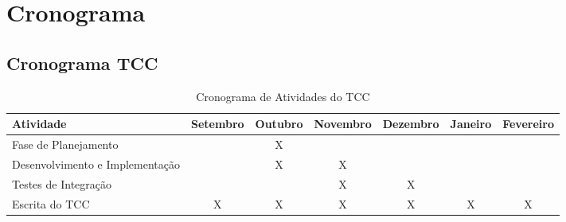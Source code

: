 \chapter{Cronograma}

\section{Cronograma TCC}

\begin{flushright}
\begin{table}[h!]
        \begin{tabular}{|m{3cm}|c|c|c|c|c|c|}
        \hline
        \textbf{Atividade} & \textbf{Setembro} & \textbf{Outubro} & \textbf{Novembro} & \textbf{Dezembro} & \textbf{Janeiro} & \textbf{Fevereiro} \\ 
        \hline
        Fase de Planejamento &  & X &  &  &  &  \\
        \hline
        Desenvolvimento e Implementação &  & X & X &  &  &  \\
        \hline
        Testes de Integração &  &  & X & X &  &  \\
        \hline
        Escrita do TCC & X & X & X & X & X & X \\
        \hline
        \end{tabular}
        \label{tab:cronograma}
        \centering
        \caption{Cronograma de Atividades do TCC}
\end{table}
\end{flushright}
